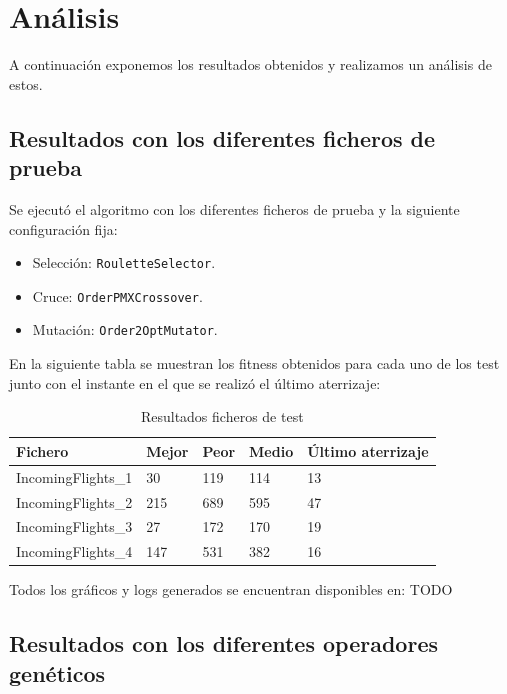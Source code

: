 \documentclass[a4paper,12pt,titlepage]{article}
\begin{document}
\section{Análisis}

A continuación exponemos los resultados obtenidos y realizamos un análisis de estos.

\subsection{Resultados con los diferentes ficheros de prueba}

Se ejecutó el algoritmo con los diferentes ficheros de prueba y la siguiente configuración fija:

\begin{itemize}[noitemsep]
	\item Selección: \lstinline|RouletteSelector|.
	\item Cruce: \lstinline|OrderPMXCrossover|.
	\item Mutación: \lstinline|Order2OptMutator|.	
\end{itemize}

En la siguiente tabla se muestran los fitness obtenidos para cada uno de los test junto con el instante en el que se realizó el último aterrizaje:

\newpage

\begin{table}[!ht]
\centering
\begin{tabular}{@{}lllll@{}}
\toprule
Fichero            & Mejor & Peor & Medio & Último aterrizaje \\ \midrule
IncomingFlights\_1 & 30    & 119  & 114   & 13                \\
IncomingFlights\_2 & 215   & 689  & 595   & 47                \\
IncomingFlights\_3 & 27    & 172  & 170   & 19                \\
IncomingFlights\_4 & 147   & 531  & 382   & 16                \\ \bottomrule
\end{tabular}
\caption{Resultados ficheros de test}
\end{table}

Todos los gráficos y logs generados se encuentran disponibles en: TODO

\subsection{Resultados con los diferentes operadores genéticos}
\end{document}
